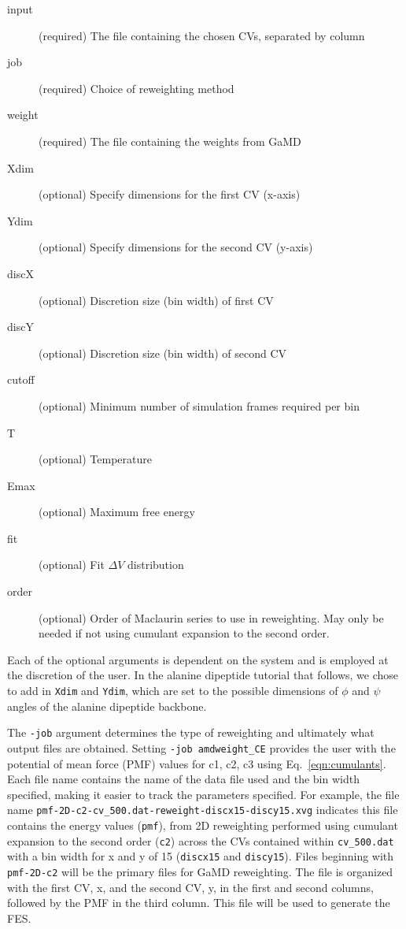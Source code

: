 \documentclass[9pt,tutorial]{livecoms}
\begin{document}
\begin{description}
    \item[input] (required) The file containing the chosen CVs, separated by column
    \item[job] (required) Choice of reweighting method
    \item[weight] (required) The file containing the weights from GaMD
    \item[Xdim] (optional) Specify dimensions for the first CV (x-axis)
    \item[Ydim] (optional) Specify dimensions for the second CV (y-axis)
    \item[discX] (optional) Discretion size (bin width) of first CV
    \item[discY] (optional) Discretion size (bin width) of second CV
    \item[cutoff] (optional) Minimum number of simulation frames required per bin
    \item[T] (optional) Temperature
    \item[Emax] (optional) Maximum free energy
    \item[fit] (optional) Fit $\Delta{V}$ distribution
    \item[order] (optional) Order of Maclaurin series to use in reweighting. May only be needed if not using cumulant expansion to the second order.
\end{description}

Each of the optional arguments is dependent on the system and is employed at the discretion of the user. In the alanine dipeptide tutorial that follows, we chose to add in \texttt{Xdim} and \texttt{Ydim}, which are set to the possible dimensions of $\phi$ and $\psi$ angles of the alanine dipeptide backbone.

The \texttt{-job} argument determines the type of reweighting and ultimately what output files are obtained. Setting \texttt{-job amdweight\_CE} provides the user with the potential of mean force (PMF) values for c1, c2, c3 using Eq.~\ref{eqn:cumulants}. Each file name contains the name of the data file used and the bin width specified, making it easier to track the parameters specified. For example, the file name \texttt{pmf-2D-c2-cv\_500.dat-reweight-discx15-discy15.xvg} indicates this file contains the energy values (\texttt{pmf}), from 2D reweighting performed using cumulant expansion to the second order (\texttt{c2}) across the CVs contained within \texttt{cv\_500.dat} with a bin width for x and y of 15 (\texttt{discx15} and \texttt{discy15}). Files beginning with \texttt{pmf-2D-c2} will be the primary files for GaMD reweighting. The file is organized with the first CV, x, and the second CV, y, in the first and second columns, followed by the PMF in the third column. This file will be used to generate the FES.
\end{document}
